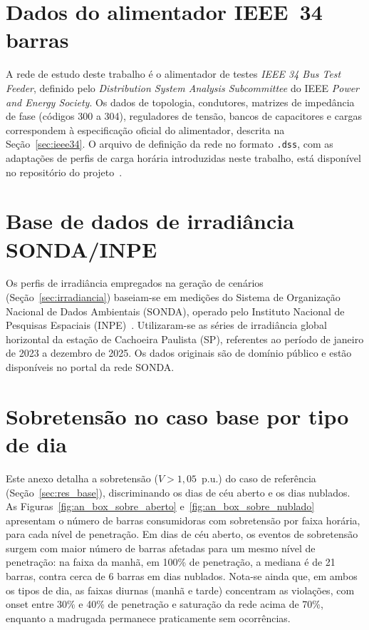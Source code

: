 \chapter{Dados do alimentador IEEE~34 barras}
\label{an:ieee34}

A rede de estudo deste trabalho é o alimentador de testes \emph{IEEE 34 Bus Test Feeder}, definido pelo \emph{Distribution System Analysis Subcommittee} do IEEE \emph{Power and Energy Society}. Os dados de topologia, condutores, matrizes de impedância de fase (códigos 300 a 304), reguladores de tensão, bancos de capacitores e cargas correspondem à especificação oficial do alimentador, descrita na Seção~\ref{sec:ieee34}. O arquivo de definição da rede no formato \texttt{.dss}, com as adaptações de perfis de carga horária introduzidas neste trabalho, está disponível no repositório do projeto~\cite{repositorio}.

\chapter{Base de dados de irradiância SONDA/INPE}
\label{an:sonda}

Os perfis de irradiância empregados na geração de cenários (Seção~\ref{sec:irradiancia}) baseiam-se em medições do Sistema de Organização Nacional de Dados Ambientais (SONDA), operado pelo Instituto Nacional de Pesquisas Espaciais (INPE)~\cite{inpe_sonda}. Utilizaram-se as séries de irradiância global horizontal da estação de Cachoeira Paulista (SP), referentes ao período de janeiro de 2023 a dezembro de 2025. Os dados originais são de domínio público e estão disponíveis no portal da rede SONDA.

\chapter{Sobretensão no caso base por tipo de dia}
\label{an:base_sobretensao}

Este anexo detalha a sobretensão ($V > 1{,}05$~p.u.) do caso de referência (Seção~\ref{sec:res_base}), discriminando os dias de céu aberto e os dias nublados. As Figuras~\ref{fig:an_box_sobre_aberto} e~\ref{fig:an_box_sobre_nublado} apresentam o número de barras consumidoras com sobretensão por faixa horária, para cada nível de penetração. Em dias de céu aberto, os eventos de sobretensão surgem com maior número de barras afetadas para um mesmo nível de penetração: na faixa da manhã, em 100\% de penetração, a mediana é de 21 barras, contra cerca de 6 barras em dias nublados. Nota-se ainda que, em ambos os tipos de dia, as faixas diurnas (manhã e tarde) concentram as violações, com onset entre 30\% e 40\% de penetração e saturação da rede acima de 70\%, enquanto a madrugada permanece praticamente sem ocorrências.

